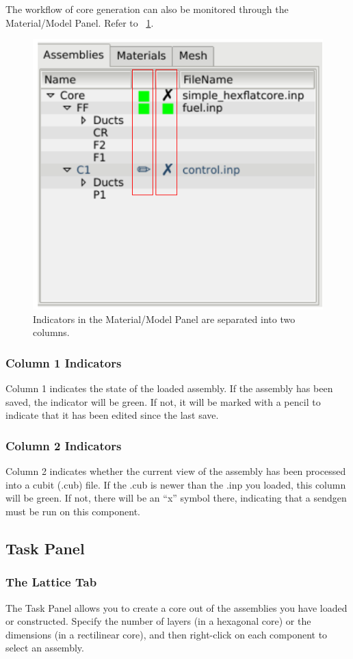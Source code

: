 The workflow of core generation can also be monitored through the Material/Model Panel.  Refer to ~\ref{fig:mmpanel1}.
\begin{figure}[!htb]
\begin{center}
\includegraphics[width=0.6\linewidth]{Images/material-model-panel-labeled-e1.png}
\caption{Indicators in the Material/Model Panel are separated into two columns.}
\label{fig:mmpanel1}
\end{center}
\end{figure}


\subsubsection{Column 1 Indicators}
Column 1 indicates the state of the loaded assembly.  If the assembly has been saved, the indicator will be green.  If not, it will be marked with a pencil to indicate that it has been edited since the last save.

\subsubsection{Column 2 Indicators}
Column 2 indicates whether the current view of the assembly has been processed into a cubit (.cub) file.  If the .cub is newer than the .inp you loaded, this column will be green.  If not, there will be an ``x'' symbol there, indicating that a sendgen must be run on this component.

\subsection{Task Panel}
\subsubsection{The Lattice Tab}
The Task Panel allows you to create a core out of the assemblies you have loaded or constructed.  Specify the number of layers (in a hexagonal core) or the dimensions (in a rectilinear core), and then right-click on each component to select an assembly.

